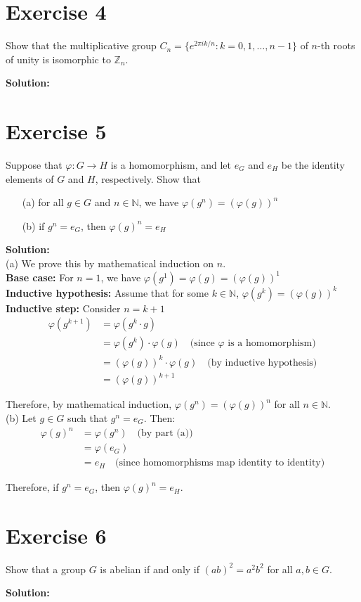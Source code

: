 \documentclass{article}
\begin{document}
\newpage

\section*{Exercise 4}
Show that the multiplicative group $C_n = \{e^{2\pi i k/n} : k = 0,1,\ldots,n-1\}$ of $n$-th roots of unity is isomorphic to $\mathbb{Z}_n$.

\textbf{Solution:}
\newpage

\section*{Exercise 5}
Suppose that $\varphi: G \to H$ is a homomorphism, and let $e_G$ and $e_H$ be the identity elements of $G$ and $H$, respectively. Show that
\begin{itemize}
\item[(a)] for all $g \in G$ and $n \in \mathbb{N}$, we have $\varphi(g^n) = (\varphi(g))^n$
\item[(b)] if $g^n = e_G$, then $\varphi(g)^n = e_H$
\end{itemize}

\textbf{Solution:} \\

(a) We prove this by mathematical induction on $n$. \\

\textbf{Base case:} For $n = 1$, we have
$\varphi(g^1) = \varphi(g) = (\varphi(g))^1$ \\

\textbf{Inductive hypothesis:} Assume that for some $k \in \mathbb{N}$, 
$\varphi(g^k) = (\varphi(g))^k$ \\

\textbf{Inductive step:} Consider $n = k + 1$
\begin{align*}
\varphi(g^{k+1}) &= \varphi(g^k \cdot g) \\
&= \varphi(g^k) \cdot \varphi(g) \quad \text{(since $\varphi$ is a homomorphism)} \\
&= (\varphi(g))^k \cdot \varphi(g) \quad \text{(by inductive hypothesis)} \\
&= (\varphi(g))^{k+1}
\end{align*}

Therefore, by mathematical induction, $\varphi(g^n) = (\varphi(g))^n$ for all $n \in \mathbb{N}$. \\

(b) Let $g \in G$ such that $g^n = e_G$. Then:
\begin{align*}
\varphi(g)^n &= \varphi(g^n) \quad \text{(by part (a))} \\
&= \varphi(e_G) \\
&= e_H \quad \text{(since homomorphisms map identity to identity)}
\end{align*}

Therefore, if $g^n = e_G$, then $\varphi(g)^n = e_H$.
\newpage

\section*{Exercise 6}
Show that a group $G$ is abelian if and only if $(ab)^2 = a^2b^2$ for all $a,b \in G$.

\textbf{Solution:}
\end{document}
